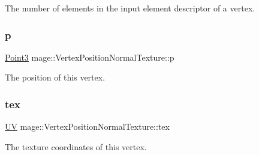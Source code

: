 The number of elements in the input element descriptor of a vertex. \hypertarget{structmage_1_1_vertex_position_normal_texture_a9000b80274027dd7b7d258f45523ca65}{}\label{structmage_1_1_vertex_position_normal_texture_a9000b80274027dd7b7d258f45523ca65} 
\subsubsection{\texorpdfstring{p}{p}}
{\footnotesize\ttfamily \hyperlink{structmage_1_1_point3}{Point3} mage\+::\+Vertex\+Position\+Normal\+Texture\+::p}

The position of this vertex. \hypertarget{structmage_1_1_vertex_position_normal_texture_a0782e41c5e28d421bfb47afad9af9c55}{}\label{structmage_1_1_vertex_position_normal_texture_a0782e41c5e28d421bfb47afad9af9c55} 
\subsubsection{\texorpdfstring{tex}{tex}}
{\footnotesize\ttfamily \hyperlink{structmage_1_1_u_v}{UV} mage\+::\+Vertex\+Position\+Normal\+Texture\+::tex}

The texture coordinates of this vertex. 